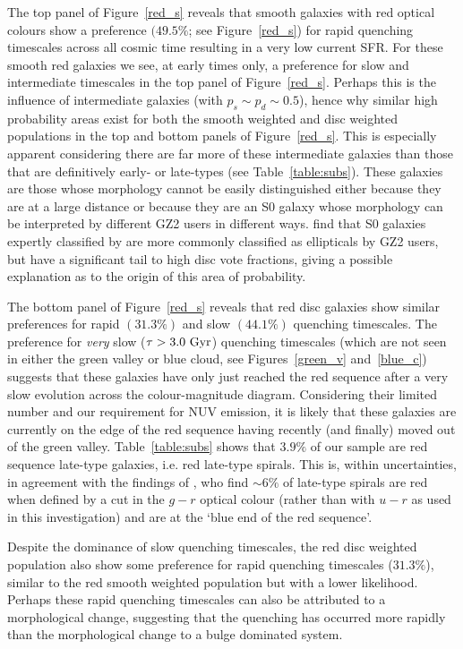 The top panel of Figure~\ref{red_s} reveals that smooth galaxies with red optical colours show a preference $(49.5\%$; see Figure~\ref{red_s}) for rapid quenching timescales across all cosmic time resulting in a very low current SFR. For these smooth red galaxies we see, at early times only, a preference for slow and intermediate timescales in the top panel of Figure~\ref{red_s}. Perhaps this is the influence of intermediate galaxies (with $p_s \sim p_d \sim 0.5$), hence why similar high probability areas exist for both the smooth weighted and disc weighted populations in the top and bottom panels of Figure~\ref{red_s}. This is especially apparent considering there are far more of these intermediate galaxies than those that are definitively early- or late-types (see Table~\ref{table:subs}). These galaxies are those whose morphology cannot be easily distinguished either because they are at a large distance or because they are an S0 galaxy whose morphology can be interpreted by different GZ2 users in different ways. \citet{GZ2} find that S0 galaxies expertly classified by \citet{nair10} are more commonly classified as ellipticals by GZ2 users, but have a significant tail to high disc vote fractions, giving a possible explanation as to the origin of this area of probability.

The bottom panel of Figure~\ref{red_s} reveals that red disc galaxies show similar preferences for rapid $(31.3\%)$ and slow $(44.1\%)$ quenching timescales. The preference for \emph{very} slow ($\tau > 3.0 ~\rm{Gyr}$) quenching timescales (which are not seen in either the green valley or blue cloud, see Figures~\ref{green_v} and~\ref{blue_c}) suggests that these  galaxies have only just reached the red sequence after a very slow evolution across the colour-magnitude diagram. Considering their limited number and our requirement for NUV emission, it is likely that these galaxies are currently on the edge of the red sequence having recently (and finally) moved out of the green valley. Table~\ref{table:subs} shows that $3.9\%$ of our sample are red sequence late-type galaxies, i.e. red late-type spirals. This is, within uncertainties, in agreement with the findings of \citet{masters10c}, who find $\sim6\%$ of late-type spirals are red when defined by a cut in the $g-r$ optical colour (rather than with $u-r$ as used in this investigation) and are at the `blue end of the red sequence'. 

Despite the dominance of slow quenching timescales, the red disc weighted population also show some preference for rapid quenching timescales ($31.3\%$), similar to the red smooth weighted population but with a lower likelihood. Perhaps these rapid quenching timescales can also be attributed to a morphological change, suggesting that the quenching has occurred more rapidly than the morphological change to a bulge dominated system.

